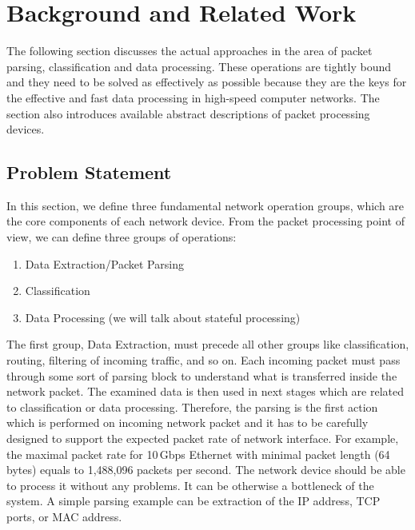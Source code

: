 \chapter{Background and Related Work}
\label{chap:stateOfTheArt}

\begin{chapterintro}
The following section discusses the actual approaches in the area of packet parsing, classification and data processing. 
These operations are tightly bound and they need to be solved as effectively as possible because 
they are the keys for the effective and fast data processing in high-speed computer networks.
The section also introduces available abstract descriptions of packet processing devices. 
\end{chapterintro}

\section{Problem Statement}
%
%

In this section, we define three fundamental network operation groups, which are the core components of each network device. 
From the packet processing point of view, we can define three groups of operations:
\begin{enumerate}
	\item Data Extraction/Packet Parsing
	\item Classification
	\item Data Processing (we will talk about stateful processing)
\end{enumerate}

The first group, Data Extraction, must precede all other groups like classification, routing, filtering of incoming traffic, and so on. 
Each incoming packet must pass through some sort of parsing block to understand what is transferred inside the network packet. 
The examined data is then used in next stages which are related to classification or 
data processing. Therefore, the parsing is the first action which is performed on incoming network packet and it has to be carefully 
designed to support the expected packet rate of network interface. 
For example, the maximal packet rate for 10\,Gbps Ethernet with minimal packet length (64 bytes) equals to 1,488,096 packets per second. 
The network device should be able to process it without any problems. 
It can be otherwise a bottleneck of the system. A simple parsing example can be extraction of the IP address, TCP ports, or MAC address.

